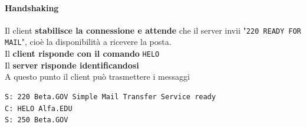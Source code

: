 \documentclass[10pt]{article}
\begin{document}
\begin{multicols}{2}
\paragraph{Handshaking}
Il client \textbf{stabilisce la connessione e attende} che il server invii "\texttt{220 READY FOR MAIL}", cioè la disponibilità a ricevere la posta.\\
Il \textbf{client risponde con il comando} \texttt{HELO}\\
Il \textbf{server risponde identificandosi}\\
A questo punto il client può trasmettere i messaggi
\columnbreak
\begin{verbatim}
S: 220 Beta.GOV Simple Mail Transfer Service ready
C: HELO Alfa.EDU
S: 250 Beta.GOV
\end{verbatim}
\end{multicols}
\end{document}

